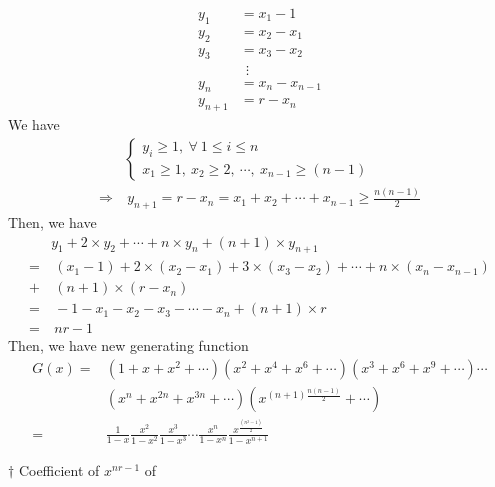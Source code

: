 \documentclass[a4paper,12pt]{article}
\begin{document}
\begin{enumerate}
\begin{equation}
		\begin{aligned}
			y_1 & = x_1 - 1 \\
			y_2 & = x_2 - x_1 \\
			y_3 & = x_3 - x_2 \\
			& \ \ \vdots \\
			y_n & = x_n - x_{n - 1} \\
			y_{n + 1} & = r - x_n
		\end{aligned}
	\end{equation} We have \begin{equation}
		\begin{aligned}
			& \begin{cases}
				y_i \ge 1, \ \forall \ 1 \le i \le n \\
				x_1 \ge 1, \ x_2 \ge 2, \ \cdots, \ x_{n - 1} \ge (n - 1)
			\end{cases} \\
			\Rightarrow & \ y_{n + 1} = r - x_n = x_1 + x_2 + \cdots + x_{n - 1} \ge \frac{n(n - 1)}{2}
		\end{aligned}
	\end{equation} Then, we have \begin{equation}
		\begin{aligned}
			& y_1 + 2 \times y_2 + \cdots + n \times y_n + (n + 1) \times y_{n + 1} \\
			= & \ (x_1 - 1) + 2 \times (x_2 - x_1) + 3 \times (x_3 - x_2) + \cdots + n \times (x_n - x_{n - 1}) \\
			+ & \ (n + 1) \times (r - x_n) \\
			= & \ -1 - x_1 - x_2 - x_3 - \cdots - x_n + (n + 1) \times r \\
			= & \ nr - 1
		\end{aligned}
	\end{equation} Then, we have new generating function \begin{equation}
		\begin{aligned}
			G(x) = & (1 + x + x^2 + \cdots)(x^2 + x^4 + x^6 + \cdots)(x^3 + x^6 + x^9 + \cdots)\cdots \\
			& (x^n + x^{2n} + x^{3n} + \cdots)(x^{(n + 1)\frac{n(n - 1)}{2}} + \cdots) \\
			= & \frac{1}{1 - x}\frac{x^2}{1 - x^2}\frac{x^3}{1 - x^3}\cdots\frac{x^n}{1 - x^n}\frac{x^{\frac{(n^2 - 1)}{2}}}{1 - x^{n + 1}}
		\end{aligned}
	\end{equation}
	\begin{answer}{$\dag$} Coefficient of $x^{nr - 1}$ of \begin{equation}

\end{equation}
\end{answer}
\end{enumerate}
\end{document}
